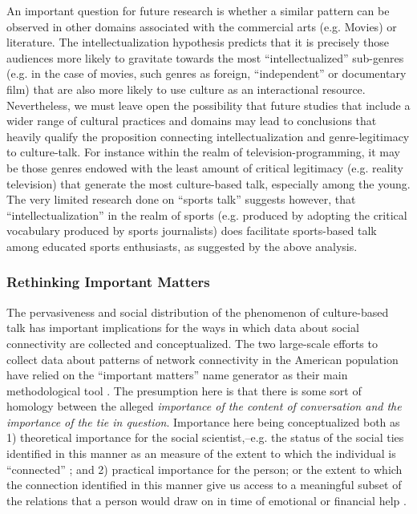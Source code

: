 \documentclass[11pt]{article}
\begin{document}
An important question for future research is whether a similar pattern can be observed in other domains associated with the commercial arts (e.g. Movies) or literature. The intellectualization hypothesis predicts that it is precisely those audiences more likely to gravitate towards the most ``intellectualized'' sub-genres (e.g.  in the case of movies, such genres as foreign, ``independent'' or documentary film) that are also more likely to use culture as an interactional resource.    Nevertheless, we must leave open the possibility that future studies that include a wider range of cultural practices and domains may lead to conclusions that heavily qualify the proposition connecting intellectualization and genre-legitimacy to culture-talk.  For instance within the realm of television-programming, it may be those genres endowed with the least amount of critical legitimacy (e.g. reality television) that generate the most culture-based talk, especially among the young.  The very limited research done on ``sports talk'' \citep{purcell07} suggests however, that ``intellectualization'' in the realm of sports (e.g. produced by adopting the critical vocabulary produced by sports journalists) does facilitate sports-based talk among educated sports enthusiasts, as suggested by the above analysis. 
 
\subsubsection{Rethinking Important Matters}
The pervasiveness and social distribution of the phenomenon of culture-based talk has important implications for the ways in which data about social connectivity are collected and conceptualized.  The two large-scale efforts to collect data about patterns of network connectivity in the American population have relied on the ``important matters'' name generator as their main methodological tool \citep{burt84, marsden87, mcpherson_etal06}. The presumption here is that there is some sort of homology between the alleged \emph{importance of the content of conversation and the importance of the tie in question}.  Importance here being conceptualized both as 1) theoretical importance for the social scientist,--e.g. the status of the social ties identified in this manner as an measure of the extent to which the individual is ``connected'' \citep{burt90}; and 2) practical importance for the person; or the extent to which the connection identified in this manner give us access to a meaningful subset of the relations that a person would draw on in time of emotional or financial help \citep{wellman_wortley90}.
\end{document}
